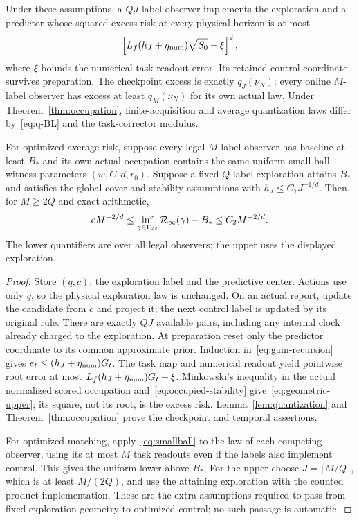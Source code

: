 \begin{theorem}\label{thm:geometry}
Under these assumptions, a $QJ$-label observer implements the exploration and a predictor whose squared excess risk at every physical horizon is at most
\begin{equation}\label{eq:geometric-upper}
 \left[L_f(h_J+\eta_{\rm num})\sqrt{S_0}+\xi\right]^2,
\end{equation}
where $\xi$ bounds the numerical task readout error. Its retained control coordinate survives preparation. The checkpoint excess is exactly $q_J(\nu_N)$; every online $M$-label observer has excess at least $q_M(\nu_N)$ for its own actual law. Under Theorem~\ref{thm:occupation}, finite-acquisition and average quantization laws differ by~\eqref{eq:q-BL} and the task-corrector modulus.

For optimized average risk, suppose every legal $M$-label observer has baseline at least $B_*$ and its own actual occupation contains the same uniform small-ball witness parameters $(w,C,d,r_0)$. Suppose a fixed $Q$-label exploration attains $B_*$ and satisfies the global cover and stability assumptions with $h_J\le C_1J^{-1/d}$. Then, for $M\ge2Q$ and exact arithmetic,
\begin{equation}\label{eq:optimized-geometry}
 cM^{-2/d}\le\inf_{\gamma\in\Gamma_M}\mathcal R_\infty(\gamma)-B_*
 \le C_2M^{-2/d}.
\end{equation}
The lower quantifiers are over all legal observers; the upper uses the displayed exploration.
\end{theorem}
\begin{proof}
Store $(q,c)$, the exploration label and the predictive center. Actions use only $q$, so the physical exploration law is unchanged. On an actual report, update the candidate from $c$ and project it; the next control label is updated by its original rule. There are exactly $QJ$ available pairs, including any internal clock already charged to the exploration. At preparation reset only the predictor coordinate to its common approximate prior. Induction in~\eqref{eq:gain-recursion} gives $e_t\le(h_J+\eta_{\rm num})G_t$. The task map and numerical readout yield pointwise root error at most $L_f(h_J+\eta_{\rm num})G_t+\xi$. Minkowski's inequality in the actual normalized scored occupation and~\eqref{eq:occupied-stability} give~\eqref{eq:geometric-upper}; its square, not its root, is the excess risk. Lemma~\ref{lem:quantization} and Theorem~\ref{thm:occupation} prove the checkpoint and temporal assertions.

For optimized matching, apply~\eqref{eq:smallball} to the law of each competing observer, using its at most $M$ task readouts even if the labels also implement control. This gives the uniform lower above $B_*$. For the upper choose $J=\lfloor M/Q\rfloor$, which is at least $M/(2Q)$, and use the attaining exploration with the counted product implementation. These are the extra assumptions required to pass from fixed-exploration geometry to optimized control; no such passage is automatic.
\end{proof}

